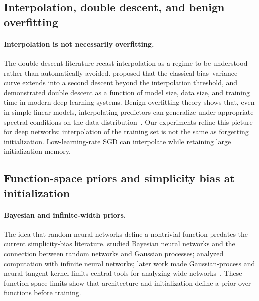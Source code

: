 \documentclass{article}
\begin{document}
\subsection{Interpolation, double descent, and benign overfitting}
\label{app:interpolation}

\paragraph{Interpolation is not necessarily overfitting.}
The double-descent literature recast interpolation as a regime to be understood rather than automatically avoided.  \citep{belkin2019reconciling} proposed that the classical bias--variance curve extends into a second descent beyond the interpolation threshold, and \citep{nakkiran2020deep} demonstrated double descent as a function of model size, data size, and training time in modern deep learning systems.  Benign-overfitting theory shows that, even in simple linear models, interpolating predictors can generalize under appropriate spectral conditions on the data distribution~\citep{bartlett2020benign}.  Our experiments refine this picture for deep networks: interpolation of the training set is not the same as forgetting initialization.  Low-learning-rate SGD can interpolate while retaining large initialization memory.

\subsection{Function-space priors and simplicity bias at initialization}
\label{app:function-priors}

\paragraph{Bayesian and infinite-width priors.}
The idea that random neural networks define a nontrivial function predates the current simplicity-bias literature.  \citep{neal1996bayesian} studied Bayesian neural networks and the connection between random networks and Gaussian processes; \citep{williams1996computing} analyzed computation with infinite neural networks; later work made Gaussian-process and neural-tangent-kernel limits central tools for analyzing wide networks~\citep{lee2018deep,jacot2018neural}.  These function-space limits show that architecture and initialization define a prior over functions before training.
\end{document}
